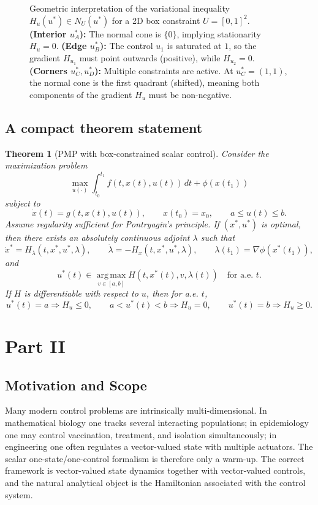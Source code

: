 \documentclass[11pt]{article}
\newtheorem{theorem}{Theorem}
\theoremstyle{definition}
\newcommand{\argmax}{\operatorname*{arg\,max}}
\begin{document}
\begin{figure}[htbp]
\caption{Geometric interpretation of the variational inequality $H_u(u^*) \in N_U(u^*)$ for a 2D box constraint $U=[0,1]^2$. 
\textbf{(Interior $u^*_A$):} The normal cone is $\{0\}$, implying stationarity $H_u=0$. 
\textbf{(Edge $u^*_B$):} The control $u_1$ is saturated at $1$, so the gradient $H_{u_1}$ must point outwards (positive), while $H_{u_2}=0$. 
\textbf{(Corners $u^*_C, u^*_D$):} Multiple constraints are active. At $u^*_C=(1,1)$, the normal cone is the first quadrant (shifted), meaning both components of the gradient $H_u$ must be non-negative.}
\label{fig:normal-cone}
\end{figure}

\subsection{A compact theorem statement}

\begin{theorem}[PMP with box-constrained scalar control]
Consider the maximization problem
\[
\max_{u(\cdot)} \int_{t_0}^{t_1} f(t,x(t),u(t))\,dt + \phi(x(t_1))
\]
subject to
\[
\dot x(t)=g(t,x(t),u(t)),\qquad x(t_0)=x_0,\qquad a\le u(t)\le b.
\]
Assume regularity sufficient for Pontryagin's principle. If $(x^*,u^*)$ is optimal, then there exists an absolutely continuous adjoint $\lambda$ such that
\[
\dot x^* = H_\lambda(t,x^*,u^*,\lambda),\qquad
\dot\lambda = -H_x(t,x^*,u^*,\lambda),
\qquad
\lambda(t_1)=\nabla\phi(x^*(t_1)),
\]
and
\[
u^*(t)\in \argmax_{v\in[a,b]} H(t,x^*(t),v,\lambda(t))
\quad \text{for a.e. } t.
\]
If $H$ is differentiable with respect to $u$, then for a.e. $t$,
\[
u^*(t)=a \Rightarrow H_u\le 0,\qquad
a<u^*(t)<b \Rightarrow H_u=0,\qquad
u^*(t)=b \Rightarrow H_u\ge 0.
\]
\end{theorem}

\section{Part II}

\subsection{Motivation and Scope}

Many modern control problems are intrinsically multi-dimensional. In mathematical biology one tracks several interacting populations; in epidemiology one may control vaccination, treatment, and isolation simultaneously; in engineering one often regulates a vector-valued state with multiple actuators. The scalar one-state/one-control formalism is therefore only a warm-up. The correct framework is vector-valued state dynamics together with vector-valued controls, and the natural analytical object is the Hamiltonian associated with the control system.
\end{document}
